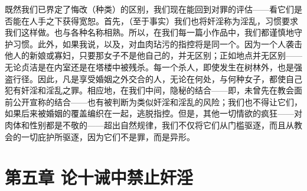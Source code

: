 既然我们已界定了悔改（种类）的区别，我们现在能回到对罪的评估——看它们是否能在人手之下获得宽恕。首先，（至于事实）我们也将奸淫称为淫乱，习惯要求我们这样做。也与各种名称相熟。所以，在我们每一篇小作品中，我们都谨慎地守护习惯。此外，如果我说，以及，对血肉玷污的指控将是同一个。因为一个人袭击他人的新娘或寡妇，只要那女子不是他自己的，并无区别；正如地点并无区别——无论贞洁是在内室还是在塔楼中被残杀。每一个杀人，即使发生在树林外，也是强盗行径。因此，凡是享受婚姻之外交合的人，无论在何处，与何种女子，都使自己犯有奸淫和淫乱之罪。相应地，在我们中间，隐秘的结合——即，未曾先在教会面前公开宣称的结合——也有被判断为类似奸淫和淫乱的风险；我们也不得让它们，如果后来被婚姻的覆盖编织在一起，逃脱指控。但是，其他一切情欲的疯狂——对肉体和性别都是不敬的——超出自然规律，我们不仅将它们从门槛驱逐，而且从教会的一切庇护所驱逐，因为它们不是罪，而是异形。\par


\section{第五章 论十诫中禁止奸淫}

